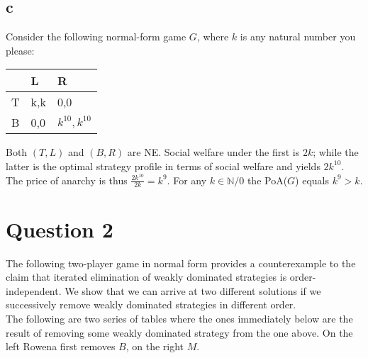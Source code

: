 \documentclass[10pt,a4paper]{article}
\begin{document}
\subsection*{c}
Consider the following normal-form game $G$, where $k$ is any natural number you please:
\begin{table}[h]
\begin{tabular}{|l|l|l|}
\hline
  & L   & R               \\ \hline
T & k,k & 0,0             \\ \hline
B & 0,0 & $k^{10},k^{10}$ \\ \hline
\end{tabular}
\end{table}

Both $(T,L)$ and $(B,R)$ are NE. Social welfare under the first is $2k$; while the latter is the optimal strategy profile in terms of social welfare and yields $2k^{10}$. The price of anarchy is thus $\tfrac{2k^{10}}{2k}=k^{9}$. For any $k\in \mathbb{N}/{0}$ the PoA($G$) equals $k^{9}>k$.
\section*{Question 2}
The following two-player game in normal form provides a counterexample to the claim that iterated elimination of weakly dominated strategies is order-independent. We show that we can arrive at two different solutions if we successively remove weakly dominated strategies in different order.\\
The following are two series of tables where the ones immediately below are the result of removing some weakly dominated strategy from the one above. On the left Rowena first removes $B$, on the right $M$.
\end{document}
